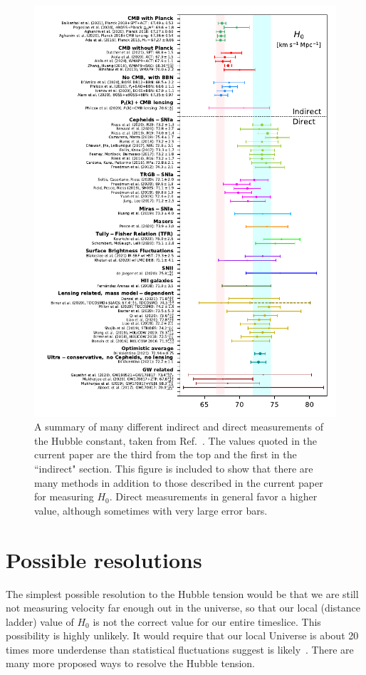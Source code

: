 \documentclass[12pt]{article}
\begin{document}
\begin{figure}
\centering
\includegraphics[width=.91\textwidth]{whisker}
\caption{A summary of many different indirect and direct measurements of the Hubble constant, taken from Ref.~\cite{DiValentino2021}. The values quoted in the current paper are the third from the top and the first in the ``indirect" section. This figure is included to show that there are many methods in addition to those described in the current paper for measuring $H_0$. Direct measurements in general favor a higher value, although sometimes with very large error bars.}
\label{fig:whisker}
\end{figure}

\section{Possible resolutions} \label{sec:resol}

The simplest possible resolution to the Hubble tension would be that we are still not measuring velocity far enough out in the universe, so that our local (distance ladder) value of $H_0$ is not the correct value for our entire timeslice. This possibility is highly unlikely. It would require that our local Universe is about 20 times more underdense than statistical fluctuations suggest is likely~\cite{DiValentino2021}. There are many more proposed ways to resolve the Hubble tension. 
\end{document}
